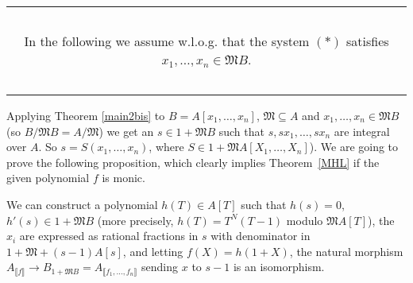 \documentclass[11pt,a4paper,twoside]{article}
\newcommand{\gothic}{\mathfrak}
\newcommand{\fM}{{\gothic M}}
\newcommand\lrb[1] {\llbracket #1 \rrbracket}
\newcommand\Af {{A_{\lrb f}}}
\newcommand \Grandcadre[1]{%
\begin{center}
\begin{tabular}{|c|}
\hline
~\\[-3mm]
#1\\[-3mm]
~\\
\hline
\end{tabular}
\end{center}
}
\begin{document}
\Grandcadre{In the following we assume w.l.o.g. that the system $(*)$ satisfies $x_1,\dots,x_n\in\fM B$.}  

Applying Theorem \ref{main2bis} to $B=A[x_1,\dots,x_n]$, 
$\fM\subseteq A$ and $x_1,\dots,x_n\in\fM B$ (so $B/\fM B=A/\fM$)
we get an $s\in1+\fM B$ such that $s,sx_1,\dots,sx_n$ are integral over $A$. So $s=S(x_1,\dots,x_n)$, where $S\in 1 +\fM A[X_1,\dots,X_n]$).
We are going to prove the following proposition, which clearly implies Theorem~\ref{MHL} if the given polynomial $f$ is monic.

\begin{proposition} \label{propMHL}
We can construct a polynomial $h(T)\in A[T]$ such that $h(s)=0$, $h'(s)\in 1+\fM B$ (more precisely, $h(T)=T^{N}(T-1)$ modulo $\fM A[T]$), the $x_i$ are expressed as rational fractions in $s$ with denominator in $1+\fM+(s-1)A[s]$, and letting $f(X)=h(1+X)$, the natural morphism ${\Af}\to B_{1+\fM B}=A_{\lrb{f_1,\dots,f_n}}$ sending $x$ to $s-1$
is an isomorphism. 
\end{proposition}
%
\end{document}
